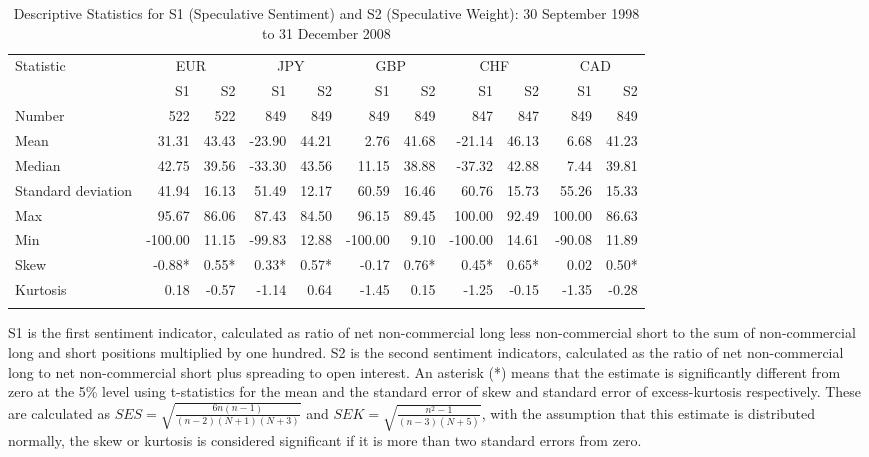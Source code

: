 \documentclass[12pt, a4paper, oneside]{article} %
\begin{document}
\begin{landscape}
\begin{table}[t]
\begin{threeparttable}
\caption{Descriptive Statistics for S1 (Speculative Sentiment) and S2 (Speculative Weight): 30 September 1998 to 31 December 2008}
\begin{tabular}{l | r r r r r r r  r r r }
  \hline
 Statistic &  \multicolumn{2}{c}{EUR} & \multicolumn{2}{c}{JPY} & \multicolumn{2}{c}{GBP} & \multicolumn{2}{c}{CHF} & \multicolumn{2}{c}{CAD}  \\
 & S1 & S2 & S1 & S2 & S1 & S2 & S1 & S2 & S1 & S2 \\  
\hline
Number & 522 &  522 & 849 & 849 & 849 & 849 & 847 & 847 & 849 & 849\\
Mean &  31.31 & 43.43 & -23.90 & 44.21 & 2.76 & 41.68 & -21.14 & 46.13 & 6.68 & 41.23\\
Median & 42.75 & 39.56 & -33.30 & 43.56 & 11.15 & 38.88 & -37.32 & 42.88 & 7.44 & 39.81\\
Standard deviation  & 41.94 & 16.13 & 51.49 & 12.17 & 60.59 & 16.46 & 60.76 & 15.73 & 55.26 & 15.33\\
Max & 95.67 & 86.06 & 87.43 & 84.50 & 96.15 & 89.45 & 100.00 & 92.49 & 100.00 & 86.63\\
Min &  -100.00 & 11.15 & -99.83 & 12.88 & -100.00 & 9.10 & -100.00 & 14.61 & -90.08 & 11.89\\
Skew  & -0.88* & 0.55* & 0.33* & 0.57* & -0.17 & 0.76* & 0.45* & 0.65* & 0.02 & 0.50*\\
Kurtosis & 0.18 & -0.57 & -1.14 & 0.64 & -1.45 & 0.15 & -1.25 & -0.15 & -1.35 & -0.28\\
\hline
 \label{tabref:DS4}
\end{tabular}
\begin{tablenotes}
\small
\item S1 is the first sentiment indicator, calculated as ratio of net non-commercial long less non-commercial short to the sum of non-commercial long and short positions multiplied by one hundred.  S2 is the second sentiment indicators, calculated as the ratio of net non-commercial long to net non-commercial short plus spreading to open interest.   An asterisk (*) means that the estimate is significantly different from zero at the 5\% level using t-statistics for the mean and the standard error of skew and standard error of excess-kurtosis respectively.  These are calculated as $SES = \sqrt{\frac{6n(n-1)}{(n-2)(N+1)(N+3)}}$ and $SEK = \sqrt{\frac{n^2-1}{(n-3)(N+5)}}$, with the assumption that this estimate is distributed normally, the skew or kurtosis is considered significant if it is more than two standard errors from zero.
\end{tablenotes}
\end{threeparttable}
\end{table}
\end{landscape}
\end{document}
